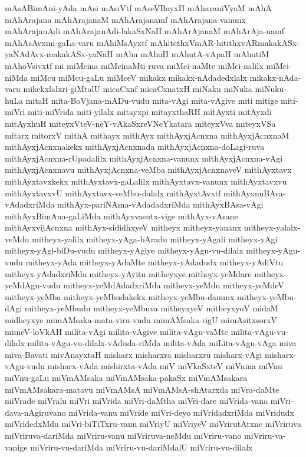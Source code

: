 {mAsABimAni-yAda
mAsi
mAsiVtf
mAseVBayxH
mAhavaniVyaM
mAhA
mAhArajana
mAhArajanaM
mAhArajanamf
mAhArajana-vanunx
mAhArajanAdi
mAhArajanAdi-lakaSxNaH
mAhArAjanaM
mAhArAja-namf
mAhAsAvxmi-gaLa-varu
mAhiMsAyxtf
mAhitethxVmAR-hitithxvARmakakASx-yaNAdAvx-makakASx-yaNaH
mAhu
mAhuH
mAhutA-vApaH
mAhutiM
mAhoVsivxtf
mi
miMcina
miMcinaMti-ruva
miMci-naMte
miMci-nalilx
miMci-niMda
miMcu
miMcu-gaLu
miMceV
mikakx
mikakx-nAdadedxlalx
mikakx-nAda-varu
mikekxlalxri-giMtalU
micaCxnf
micaCxnatxH
miNaku
miNuka
miNuku-huLa
mitaH
mita-BoVjana-mADu-vudu
mita-vAgi
mita-vAgive
miti
mitige
miti-miVri
miti-miVrida
miti-yilalx
mitayxpi
mitayxthaRH
mitAyxti
mitAyxdi
mitAyxhuH
miteyxVteV-neY-vAkaSxreVNeYkatara
miteyxVva
miteyxVSa
mitarx
mitorxV
mithA
mithayx
mithAyx
mithAyxjAcnxna
mithAyxjAcnxnaM
mithAyxjAcnxnakekx
mithAyxjAcnxnada
mithAyxjAcnxna-doLagi-ruva
mithAyxjAcnxna-rUpadalilx
mithAyxjAcnxna-vanunx
mithAyxjAcnxna-vAgi
mithAyxjAcnxnavu
mithAyxjAcnxna-veMba
mithAyxjAcnxnaveV
mithAyxtavx
mithAyxtavxkekx
mithAyxtavx-gaLalilx
mithAyxtavx-vanunx
mithAyxtavxvu
mithAyxtavxvU
mithAyxtavx-veMbu-dalalx
mithAyxtAvxtf
mithAyxnuBAva-vAdadxriMda
mithAyx-pariNAma-vAdadadxriMda
mithAyxBAsa-vAgi
mithAyxBimAna-gaLiMda
mithAyxvasutx-vige
mithAyx-vAsane
mithAyxvijAcnxna
mithAyx-sididhxyeV
mitheyx
mitheyx-yananx
mitheyx-yalalx-veMdu
mitheyx-yalilx
mitheyx-yAga-bAradu
mitheyx-yAgali
mitheyx-yAgi
mitheyx-yAgi-biDu-vudu
mitheyx-yAgiye
mitheyx-yAgu-vu-dilalx
mitheyx-yAgu-vudu
mitheyx-yAda
mitheyx-yAdaMte
mitheyx-yAdadudx
mitheyx-yAdiVtu
mitheyx-yAdadxriMda
mitheyx-yAyitu
mitheyxye
mitheyx-yeMdare
mitheyx-yeMdAgu-vudu
mitheyx-yeMdAdadxriMda
mitheyx-yeMdu
mitheyx-yeMdeV
mitheyx-yeMba
mitheyx-yeMbudakekx
mitheyx-yeMbu-danunx
mitheyx-yeMbu-dAgi
mitheyx-yeMbudu
mitheyx-yeMbuva
mitheyxyeV
mitheyxyoV
midaM
midheyxye
mimAMsaka-mata-viru-vudu
mimAMsaka-rigU
mimAsitxsorxV
mimeV-loVkAH
milita-vAgi
milita-vAgive
milita-vAgu-vaMte
milita-vAgu-vu-dilalx
milita-vAgu-vu-dilalx-vAduda-riMda
milita-vAda
miLita-vAgu-vAga
miva
miva-Bavati
mivAnayxtaH
misharx
misharxra
misharxru
misharx-vAgi
misharx-vAgu-vudu
misharx-vAda
mishirxta-vAda
miV
miVkaSxteV
miVnina
miVnu
miVnu-gaLu
miVmAMsaka
miVmAMsaka-pakaSx
miVmAMsakara
miVmAMsakara-matavu
miVmAMsA
miVmAMsA-shAtarxda
miVra-daMte
miVrade
miVralu
miVri
miVrida
miVri-daMtha
miVri-dare
miVrida-vana
miVri-dava-nAgiruvano
miVrida-vanu
miVride
miVri-deyo
miVridadxriMda
miVridudx
miVridedxMdu
miVri-biTiTxru-vanu
miVriyU
miVriyeV
miVrirutAtxne
miVriruva
miVriruva-dariMda
miVriru-vanu
miVriruva-neMdu
miVriru-vano
miVriru-va-vanige
miVriru-vu-dariMda
miVriru-vu-dariMdalU
miVriru-vu-dilalx
}
